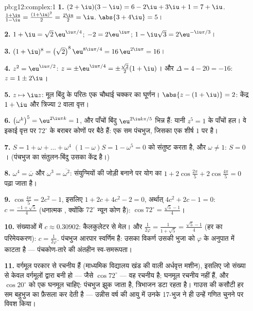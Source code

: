 \begin{solution}{pb:g12:complex:1}
\textbf{1.} $(2 + \iu)(3 - \iu) = 6 - 2\iu + 3\iu + 1 =
7 + \iu$. \quad $\frac{1 + \iu}{1 - \iu} =
\frac{(1 + \iu)^2}{2} = \frac{2\iu}{2} = \iu$. \quad $\abs{3 + 4\iu} = 5$।

\textbf{2.} $1 + \iu = \sqrt2\,\eu^{\iu\pi/4}$; $-2 = 2\eu^{\iu\pi}$; $1 - \iu\sqrt3 = 2\eu^{-\iu\pi/3}$।

\textbf{3.} $(1 + \iu)^8 = \left(\sqrt2\right)^8
\eu^{8\iu\pi/4} = 16\,\eu^{2\iu\pi} = 16$।

\textbf{4.} $z^2 = \eu^{\iu\pi/2}$: $z = \pm\eu^{\iu\pi/4} = \pm\frac{\sqrt2}{2}(1 + \iu)$। और $\Delta = 4 - 20 = -16$: $z = 1 \pm 2\iu$।

\textbf{5.} $z \mapsto \iu z$: मूल बिंदु के परितः एक चौथाई चक्कर का घूर्णन। $\abs{z - (1 + \iu)} = 2$: केंद्र
$1 + \iu$ और त्रिज्या $2$ वाला वृत्त।

\textbf{6.} $\left(\omega^k\right)^5 = \eu^{2\iu\pi k} = 1$, और पाँचों बिंदु $\eu^{2\iu k\pi/5}$ भिन्न हैं: यानी $z^5 = 1$ के पाँचों हल।
वे इकाई वृत्त पर $72^\circ$ के बराबर कोणों पर बैठे हैं: एक सम पंचभुज, जिसका एक
शीर्ष $1$ पर है।

\textbf{7.} $S = 1 + \omega + \dots + \omega^4$ $(1 - \omega)S = 1 - \omega^5 = 0$ को संतुष्ट करता है, और $\omega \neq 1$: $S = 0$। (पंचभुज का
संतुलन-बिंदु उसका केंद्र है।)

\textbf{8.} $\omega^4 = \overline\omega$ और $\omega^3 = \overline{\omega^2}$: संयुग्मियों की जोड़ी बनाने पर योग का 
$1 + 2\cos\frac{2\pi}{5} + 2\cos\frac{4\pi}{5} = 0$ पढ़ा जाता है।

\textbf{9.} $\cos\frac{4\pi}{5} = 2c^2 - 1$, इसलिए $1 + 2c + 4c^2 - 2 = 0$, अर्थात् $4c^2 + 2c - 1 = 0$: $c = \frac{-1 + \sqrt5}{4}$ (धनात्मक , क्योंकि
$72^\circ$ न्यून कोण है): $\cos 72^\circ = \frac{\sqrt5 - 1}{4}$।

\textbf{10.} संख्याओं में $c \approx 0.30902$: कैलकुलेटर से मेल। और $\frac{1}{2\varphi} = \frac{1}{1 + \sqrt5} =
\frac{\sqrt5 - 1}{4}$ (हर का परिमेयकरण):
$c = \frac{1}{2\varphi}$. पंचभुज आरपार स्वर्णिम है: उसका विकर्ण उसकी भुजा को $\varphi$ के अनुपात
में काटता है --- पंचकोण-तारे की अंतहीन स्व-समरूपता।

\textbf{11.} वर्गमूल परकार से रचनीय हैं (माध्यमिक विद्यालय खंड की 
 वाली अर्धवृत्त मशीन), इसलिए जो संख्या  से केवल वर्गमूलों
द्वारा बनी हो --- जैसे $\cos 72^\circ$ --- वह रचनीय है; घनमूल रचनीय नहीं हैं, और $\cos 20^\circ$
को एक घनमूल चाहिए: पंचभुज झुक जाता है, त्रिभाजन डटा रहता है। गाउस की कसौटी हर
सम बहुभुज का फ़ैसला कर देती है --- उन्नीस वर्ष की आयु में उनके 17-भुज ने ही
उन्हें गणित चुनने पर विवश किया।


\end{solution}

